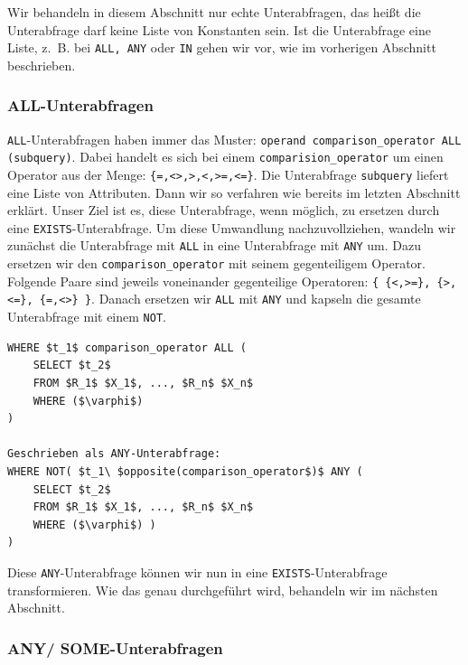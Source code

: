 Wir behandeln in diesem Abschnitt nur echte Unterabfragen, das heißt die Unterabfrage darf keine Liste von Konstanten sein. Ist die Unterabfrage eine Liste, \mbox{z. B.} bei \verb|ALL, ANY| oder \verb|IN| gehen wir vor, wie im vorherigen Abschnitt beschrieben.

\subsubsection*{ALL-Unterabfragen}

\verb|ALL|-Unterabfragen haben immer das Muster: \verb|operand comparison_operator ALL (subquery)|. Dabei handelt es sich bei einem \verb|comparision_operator| um einen Operator aus der Menge: \verb|{=,<>,>,<,>=,<=}|. Die Unterabfrage \verb|subquery| liefert eine Liste von Attributen. Dann wir so verfahren wie bereits im letzten Abschnitt erklärt. Unser Ziel ist es, diese Unterabfrage, wenn möglich, zu ersetzen durch eine \verb|EXISTS|-Unterabfrage. Um diese Umwandlung nachzuvollziehen, wandeln wir zunächst die Unterabfrage mit \verb|ALL| in eine Unterabfrage mit \verb|ANY| um. Dazu ersetzen wir den \verb|comparison_operator| mit seinem gegenteiligem Operator. Folgende Paare sind jeweils voneinander gegenteilige Operatoren: \verb|{ {<,>=}, {>,<=}, {=,<>} }|. Danach ersetzen wir \verb|ALL| mit \verb|ANY| und kapseln die gesamte Unterabfrage mit einem \verb|NOT|. 

\begin{lstlisting}[mathescape]
WHERE $t_1$ comparison_operator ALL (
	SELECT $t_2$
	FROM $R_1$ $X_1$, ..., $R_n$ $X_n$
	WHERE ($\varphi$)
)

Geschrieben als ANY-Unterabfrage:
WHERE NOT( $t_1\ $opposite(comparison_operator$)$ ANY (
	SELECT $t_2$
	FROM $R_1$ $X_1$, ..., $R_n$ $X_n$
	WHERE ($\varphi$) ) 
)
\end{lstlisting}

Diese \verb|ANY|-Unterabfrage können wir nun in eine \verb|EXISTS|-Unterabfrage transformieren. Wie das genau durchgeführt wird, behandeln wir im nächsten Abschnitt.


\subsubsection*{ANY/ SOME-Unterabfragen}

